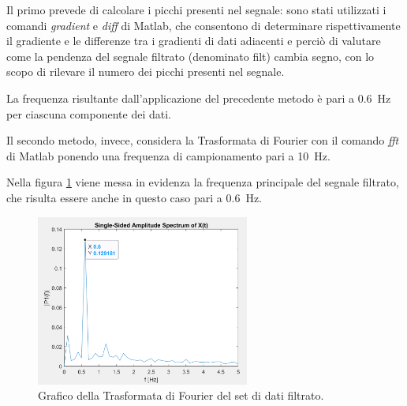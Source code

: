 Il primo prevede di calcolare i picchi presenti nel segnale: sono stati utilizzati i comandi \textit{gradient} e \textit{diff} di Matlab, che consentono di determinare rispettivamente il gradiente e le differenze tra i gradienti di dati adiacenti e perciò di valutare come la pendenza del segnale filtrato (denominato filt) cambia segno, con lo scopo di rilevare il numero dei picchi presenti nel segnale.


La frequenza risultante dall'applicazione del precedente metodo è pari a \SI{0.6}{\hertz} per ciascuna componente dei dati.

Il secondo metodo, invece, considera la Trasformata di Fourier con il comando \textit{fft} di Matlab ponendo una frequenza di campionamento pari a \SI{10}{\hertz}.


Nella figura \ref{fig:plot_fft} viene messa in evidenza la frequenza principale del segnale filtrato, che risulta essere anche in questo caso pari a \SI{0.6}{\hertz}.
\begin{figure}[tbh]
	\centering		\includegraphics[width=7cm]{./ImageFiles/plot2_arr2.png}
	\caption{Grafico della Trasformata di Fourier del set di dati filtrato.}
	\label{fig:plot_fft}
\end{figure}